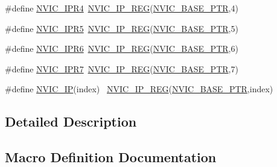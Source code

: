 \begin{DoxyCompactItemize}
\#define \hyperlink{group___n_v_i_c___register___accessor___macros_ga2f5750fd7f9ff72cda865eb7192afae3}{N\+V\+I\+C\+\_\+\+I\+P\+R4}~\hyperlink{group___n_v_i_c___register___accessor___macros_gac7b3df65f95ff3ad60a655db439a45a2}{N\+V\+I\+C\+\_\+\+I\+P\+\_\+\+R\+EG}(\hyperlink{group___n_v_i_c___peripheral_ga28f0a055d0c218e16d1fc7b13ff0caa5}{N\+V\+I\+C\+\_\+\+B\+A\+S\+E\+\_\+\+P\+TR},4)
\item 
\#define \hyperlink{group___n_v_i_c___register___accessor___macros_ga86802cec04cf0988062781f67bcaad9a}{N\+V\+I\+C\+\_\+\+I\+P\+R5}~\hyperlink{group___n_v_i_c___register___accessor___macros_gac7b3df65f95ff3ad60a655db439a45a2}{N\+V\+I\+C\+\_\+\+I\+P\+\_\+\+R\+EG}(\hyperlink{group___n_v_i_c___peripheral_ga28f0a055d0c218e16d1fc7b13ff0caa5}{N\+V\+I\+C\+\_\+\+B\+A\+S\+E\+\_\+\+P\+TR},5)
\item 
\#define \hyperlink{group___n_v_i_c___register___accessor___macros_ga0986846cc9f1bf5c816ec885eda9aed8}{N\+V\+I\+C\+\_\+\+I\+P\+R6}~\hyperlink{group___n_v_i_c___register___accessor___macros_gac7b3df65f95ff3ad60a655db439a45a2}{N\+V\+I\+C\+\_\+\+I\+P\+\_\+\+R\+EG}(\hyperlink{group___n_v_i_c___peripheral_ga28f0a055d0c218e16d1fc7b13ff0caa5}{N\+V\+I\+C\+\_\+\+B\+A\+S\+E\+\_\+\+P\+TR},6)
\item 
\#define \hyperlink{group___n_v_i_c___register___accessor___macros_gaef45ccd66db0bd808d945cdfa64d622b}{N\+V\+I\+C\+\_\+\+I\+P\+R7}~\hyperlink{group___n_v_i_c___register___accessor___macros_gac7b3df65f95ff3ad60a655db439a45a2}{N\+V\+I\+C\+\_\+\+I\+P\+\_\+\+R\+EG}(\hyperlink{group___n_v_i_c___peripheral_ga28f0a055d0c218e16d1fc7b13ff0caa5}{N\+V\+I\+C\+\_\+\+B\+A\+S\+E\+\_\+\+P\+TR},7)
\item 
\#define \hyperlink{group___n_v_i_c___register___accessor___macros_gad215e21e79fd6c4c0b310324a51b0a34}{N\+V\+I\+C\+\_\+\+IP}(index)                                                  ~\hyperlink{group___n_v_i_c___register___accessor___macros_gac7b3df65f95ff3ad60a655db439a45a2}{N\+V\+I\+C\+\_\+\+I\+P\+\_\+\+R\+EG}(\hyperlink{group___n_v_i_c___peripheral_ga28f0a055d0c218e16d1fc7b13ff0caa5}{N\+V\+I\+C\+\_\+\+B\+A\+S\+E\+\_\+\+P\+TR},index)
\end{DoxyCompactItemize}


\subsection{Detailed Description}


\subsection{Macro Definition Documentation}
